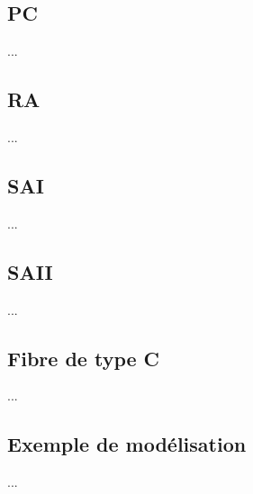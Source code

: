 \subsection{PC}
...

\subsection{RA}
...

\subsection{SAI}
...

\subsection{SAII}
...

\subsection{Fibre de type C}
...

\subsection{Exemple de modélisation}
...

